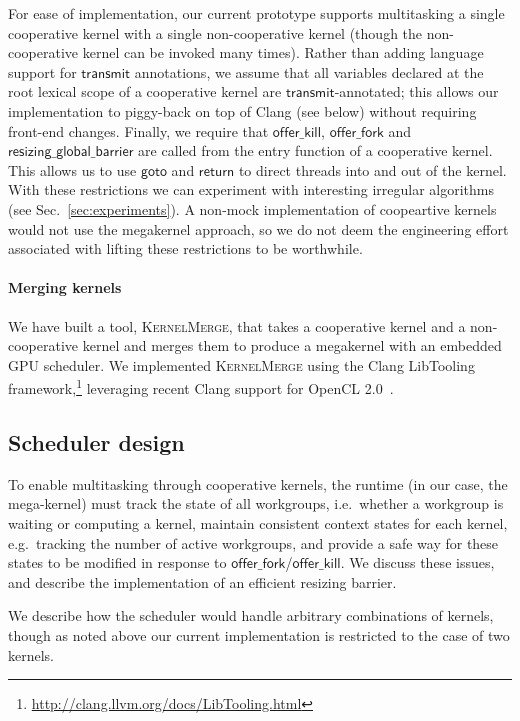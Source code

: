 \documentclass[numbers,nocopyrightspace,10pt]{sigplanconf}
\newcommand{\kernelmerge}{\textsc{KernelMerge}}
\newcommand{\mysec}{Sec.~}
\newcommand{\transmit}{\mathsf{transmit}}
\newcommand{\offerfork}{\mathsf{offer\_fork}}
\newcommand{\offerkill}{\mathsf{offer\_kill}}
\newcommand{\resizingglobalbarrier}{\mathsf{resizing\_global\_barrier}}
\newcommand{\keyword}[1]{\mathsf{#1}}
\begin{document}
For ease of implementation, our current prototype supports
multitasking a single cooperative kernel with a single non-cooperative
kernel (though the non-cooperative kernel can be invoked many times).
Rather than adding language support for $\transmit$ annotations, we
assume that all variables declared at the root lexical scope of a
cooperative kernel are $\transmit$-annotated; this allows our
implementation to piggy-back on top of Clang (see below) without
requiring front-end changes.  Finally, we require that $\offerkill$,
$\offerfork$ and $\resizingglobalbarrier$ are called from the entry
function of a cooperative kernel.  This allows us to use
$\keyword{goto}$ and $\keyword{return}$ to direct threads into and out
of the kernel.  With these restrictions we can experiment
with interesting irregular algorithms (see
\mysec\ref{sec:experiments}).  A non-mock implementation of
coopeartive kernels would not use the megakernel approach, so we do not deem
the engineering effort associated with lifting these restrictions to
be worthwhile.

\paragraph{Merging kernels}

We have built a tool, \kernelmerge{}, that takes a cooperative kernel
and a non-cooperative kernel and merges them to produce a megakernel
with an embedded GPU scheduler.  We implemented \kernelmerge{} using the Clang LibTooling framework,\footnote{\url{http://clang.llvm.org/docs/LibTooling.html}}
leveraging recent Clang support for OpenCL 2.0~\cite{ClangOpenCL20}.

\subsection{Scheduler design}\label{sec:resizingbarrier}\label{sec:schedulerimpl}

To enable multitasking through cooperative kernels, the runtime (in
our case, the mega-kernel) must track the state of all
workgroups, i.e.\ whether a workgroup is waiting or computing a kernel,
maintain consistent context states for each kernel, e.g.\ tracking the number
of active workgroups, and provide a
safe way for these states to be modified in response to $\offerfork$/$\offerkill$. We discuss these issues,
and describe the implementation of an efficient resizing barrier.

We describe how the scheduler would handle arbitrary
combinations of kernels, though as noted above our current
implementation is restricted to the case of two kernels.
\end{document}
